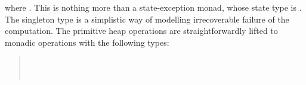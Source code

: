 \documentclass[copyright,creativecommons,sharealike]{eptcs}
\theoremstyle{remark}
\begin{document}
\begin{isabellebody}
\begin{isamarkuptext}
\begin{quote}
  \mbox{}
\end{quote}
  where .
  This is nothing more than a state-exception monad, whose state type
  is . The singleton type  is a simplistic way of
  modelling irrecoverable failure of the computation. The primitive heap operations
  are straightforwardly lifted to monadic operations with the
  following types:
  \begin{quote}
    \\
    \\
  \end{quote}
  

\end{isamarkuptext}
\end{isabellebody}
\end{document}

